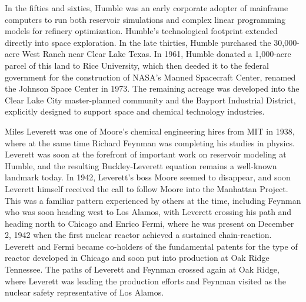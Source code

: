 In the fifties and sixties, Humble was an early corporate adopter of mainframe computers to run both reservoir simulations and complex linear programming models for refinery optimization. Humble’s technological footprint extended directly into space exploration. In the late thirties, Humble purchased the 30,000-acre West Ranch near Clear Lake Texas. In 1961, Humble donated a 1,000-acre parcel of this land to Rice University, which then deeded it to the federal government for the construction of NASA’s Manned Spacecraft Center, renamed the Johnson Space Center in 1973. The remaining acreage was developed into the Clear Lake City master-planned community and the Bayport Industrial District, explicitly designed to support space and chemical technology industries.

Miles Leverett was one of Moore’s chemical engineering hires from MIT in 1938, where at the same time Richard Feynman was completing his studies in physics. Leverett was soon at the forefront of important work on reservoir modeling at Humble, and the resulting Buckley-Leverett equation remains a well-known landmark today. In 1942, Leverett’s boss Moore seemed to disappear, and soon Leverett himself received the call to follow Moore into the Manhattan Project. This was a familiar pattern experienced by others at the time, including Feynman who was soon heading west to Los Alamos, with Leverett crossing his path and heading north to Chicago and Enrico Fermi, where he was present on December 2, 1942 when the first nuclear reactor achieved a sustained chain-reaction. Leverett and Fermi became co-holders of the fundamental patents for the type of reactor developed in Chicago and soon put into production at Oak Ridge Tennessee. The paths of Leverett and Feynman crossed again at Oak Ridge, where Leverett was leading the production efforts and Feynman visited as the nuclear safety representative of Los Alamos. \cite{buckleyMechanismFluidDisplacement1942} \cite{leverettFlowOilwaterMixtures1939} \cite{fermiMethodSustainingNeutronic1957} \cite{gleickGeniusLifeScience1992}

